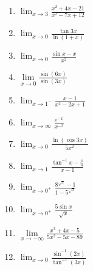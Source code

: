 \documentclass[12pt]{article}
\newif\ifans
\begin{document}
\begin{enumerate}

\item $\lim_{x \rightarrow 3}{\frac{x^2+4x-21}{x^2-7x+12}}$

\ifans{\fbox{$-10$}} \fi

\item $ \lim_{x \rightarrow 0}{\frac{\tan{3x}}{\ln{(1+x)}}}$

\ifans{\fbox{$3$}} \fi

\item $\lim_{x \rightarrow 0}{\frac{\sin{x}-x}{x^2}}$

\ifans{\fbox{$0$}} \fi

\item $\lim\limits_{x\rightarrow 0} \frac{\sin{(6x)}}{\sin{(3x)}}$ 

\ifans{\fbox{$2$}} \fi

\item $\lim_{x \rightarrow 1^-}{\frac{x-1}{x^2-2x+1}}$

\ifans{\fbox{$-\infty$}} \fi

\item $\lim_{x \rightarrow \infty}{\frac{e^{-x}}{x^{-2}}}$

\ifans{\fbox{$0$}} \fi

\item $\lim_{x \rightarrow 0}{\frac{\ln{(\cos{3x})}}{5x^2}}$

\ifans{\fbox{$-\frac{9}{10}$}} \fi

\item $\lim_{x \rightarrow 1}{\frac{\tan^{-1}{x}-\frac{\pi}{4}}{x-1}}$

\ifans{\fbox{$\frac{1}{2}$}} \fi

\item $\lim_{x \rightarrow 0^{+}}{\frac{8^{\sqrt{x}}-1}{1-5^{\sqrt{x}}}}$

\ifans{\fbox{$-\frac{3\ln{2}}{\ln{5}}$}} \fi

\item $\lim_{x\rightarrow 0^{+}}{\frac{5\sin{x}}{\sqrt{x}}}$

\ifans{\fbox{$0$}} \fi

\item $\lim\limits_{x\rightarrow -\infty} \frac{x^3+4x-5}{5x^2-5x-89}$  

\ifans{\fbox{$-\infty$}} \fi

\item $\lim_{x \rightarrow 0}{\frac{\sin^{-1}{(2x)}}{\tan^{-1}{(3x)}}}$


\end{enumerate}
\end{document}
